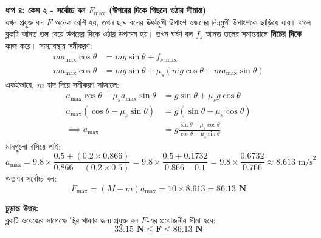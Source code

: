 \documentclass[12pt, a4paper]{article}
\begin{document}
\begin{tcolorbox}[solutionbox={সমাধান (Solution)}]
\vspace{0.5em}
\noindent
\textbf{ধাপ ৪: কেস ২ - সর্বোচ্চ বল $F_{\text{max}}$ (উপরের দিকে পিছলে ওঠার সীমান্ত)} \\
যখন প্রযুক্ত বল $F$ অনেক বেশি হয়, তখন ছদ্ম বলের ঊর্ধ্বমুখী উপাংশ ওজনের নিম্নমুখী উপাংশকে ছাড়িয়ে যায়। ফলে ব্লকটি আনত তল বেয়ে উপরের দিকে ওঠার উপক্রম হয়। তখন ঘর্ষণ বল $f_s$ আনত তলের সমান্তরালে \textbf{নিচের দিকে} কাজ করে।
সাম্যাবস্থার সমীকরণ:
\begin{align*}
ma_{\text{max}} \cos\theta &= mg \sin\theta + f_{s,\text{max}} \\
ma_{\text{max}} \cos\theta &= mg \sin\theta + \mu_s (mg \cos\theta + ma_{\text{max}} \sin\theta)
\end{align*}
একইভাবে, $m$ বাদ দিয়ে সমীকরণ সাজালে:
\begin{align*}
a_{\text{max}} \cos\theta - \mu_s a_{\text{max}} \sin\theta &= g \sin\theta + \mu_s g \cos\theta \\
a_{\text{max}}(\cos\theta - \mu_s \sin\theta) &= g(\sin\theta + \mu_s \cos\theta) \\
\implies a_{\text{max}} &= g \frac{\sin\theta + \mu_s \cos\theta}{\cos\theta - \mu_s \sin\theta}
\end{align*}
মানগুলো বসিয়ে পাই:
\[ a_{\text{max}} = 9.8 \times \frac{0.5 + (0.2 \times 0.866)}{0.866 - (0.2 \times 0.5)} = 9.8 \times \frac{0.5 + 0.1732}{0.866 - 0.1} = 9.8 \times \frac{0.6732}{0.766} \approx 8.613 \text{ m/s}^2 \]
অতএব সর্বোচ্চ বল:
\[ F_{\text{max}} = (M + m) a_{\text{max}} = 10 \times 8.613 = \mathbf{86.13 \text{ N}} \]

\vspace{1em}
\begin{tcolorbox}[answerbox]
\textbf{চূড়ান্ত উত্তর:} \\
ব্লকটি ওয়েজের সাপেক্ষে স্থির থাকার জন্য প্রযুক্ত বল $F$-এর প্রয়োজনীয় সীমা হবে:
\[ \mathbf{33.15 \text{ N} \le F \le 86.13 \text{ N}} \]
\end{tcolorbox}
\end{tcolorbox}
\end{document}
